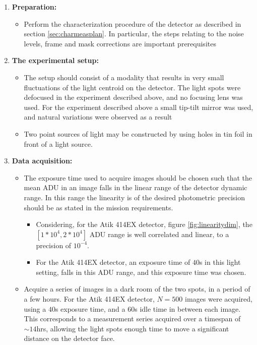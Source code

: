 \documentclass[../main.tex]{subfiles}
\begin{document}
\begin{enumerate}
	\item \textbf{Preparation:} 
	\begin{itemize}
		\item Perform the characterization procedure of the detector as described in section \ref{sec:charmeasplan}. In particular, the steps relating to the noise levels, frame and mask corrections are important prerequisites
	\end{itemize}
	\item \textbf{The experimental setup:} 
	\begin{itemize}
		\item The setup should consist of a modality that results in very small fluctuations of the light centroid on the detector. The light spots were defocused in the experiment described above, and no focusing lens was used. For the experiment described above a small tip-tilt mirror was used, and natural variations were observed as a result
		\item Two point sources of light may be constructed by using holes in tin foil in front of a light source.
	\end{itemize}
	\item \textbf{Data acquisition:}
	\begin{itemize}
		\item The exposure time used to acquire images should be chosen such that the mean ADU in an image falls in the linear range of the detector dynamic range. In this range the linearity is of the desired photometric precision should be as stated in the mission requirements.
		\begin{itemize}
			\item Considering, for the Atik 414EX detector, figure \ref{fig:linearitydim}, the $[1*10^4, 2*10^4]$ ADU range is well correlated and linear, to a precision of $10^{-4}$.
			\item For the Atik 414EX detector, an exposure time of $40$s in this light setting, falls in this ADU range, and this exposure time was chosen.
		\end{itemize}
		\item Acquire a series of images in a dark room of the two spots, in a period of a few hours. For the Atik 414EX detector, $N=500$ images were acquired, using a $40$s exposure time, and a $60$s idle time in between each image. This corresponds to a measurement series acquired over a timespan of $\sim 14$hrs, allowing the light spots enough time to move a significant distance on the detector face.

\end{itemize}
\end{enumerate}
\end{document}
